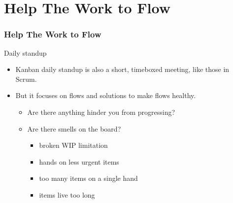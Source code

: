 \documentclass[lualatex]{beamer}
\begin{document}
\section{Help The Work to Flow}

\begin{frame}
  \frametitle{Help The Work to Flow}

  \begin{block}{Daily standup}
    \begin{itemize}
    \item Kanban daily standup is also a short, timeboxed meeting, like those in Scrum.
    \item But it focuses on flows and solutions to make flows healthy.
      \begin{itemize}
      \item Are there anything hinder you from progressing?
      \item Are there smells on the board?
        \begin{itemize}
        \item broken WIP limitation
        \item hands on less urgent items
        \item too many items on a single hand
        \item items live too long
        \end{itemize}
      \end{itemize}
    \end{itemize}
  \end{block}
\end{frame}
\end{document}
